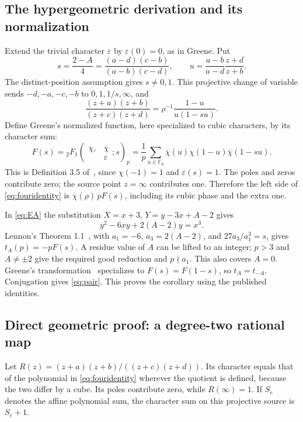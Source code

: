\documentclass[11pt]{article}
\theoremstyle{definition}\newtheorem{definition}[theorem]{Definition}
\newcommand{\Fp}{\mathbb F_p}
\begin{document}
\subsection{The hypergeometric derivation and its normalization}
Extend the trivial character $\varepsilon$ by $\varepsilon(0)=0$,
as in Greene. Put
\[
 s=\frac{2-A}{4}
   =\frac{(a-d)(c-b)}{(a-b)(c-d)},\qquad
 u=\frac{a-b}{a-d}\frac{z+d}{z+b}.
\]
The distinct-position assumption gives $s\ne0,1$. This projective
change of variable sends $-d,-a,-c,-b$ to $0,1,1/s,\infty$, and
\[
 \frac{(z+a)(z+b)}{(z+c)(z+d)}
   =\rho^{-1}\frac{1-u}{u(1-su)}.
\]
Define Greene's normalized function, here specialized to cubic
characters, by its character sum:
\begin{equation}\label{eq:greene}
 F(s)={}_2F_1\!\left(\begin{matrix}\chi,&\overline\chi\\&\varepsilon\end{matrix};s\right)_p
 =\frac1p\sum_{u\in\Fp}
      \overline\chi(u)\chi(1-u)\overline\chi(1-su).
\end{equation}
This is Definition 3.5 of~\cite[p.~82]{greene}, since
$\chi(-1)=1$ and $\varepsilon(s)=1$. The poles and zeros contribute
zero; the source point $z=\infty$ contributes one. Therefore the
left side of \eqref{eq:fouridentity} is
$\overline\chi(\rho)\,pF(s)$, including its cubic phase and the
extra one.

In \eqref{eq:EA} the substitution
$X=x+3$, $Y=y-3x+A-2$ gives
\[
 y^2-6xy+2(A-2)y=x^3.
\]
Lennon's Theorem 1.1~\cite{lennon}, with
$a_1=-6$, $a_3=2(A-2)$, and $27a_3/a_1^3=s$, gives
$t_A(p)=-pF(s)$. A residue value of $A$ can be lifted to an integer;
$p>3$ and $A\ne\pm2$ give the required good reduction and
$p\nmid a_1$. This also covers $A=0$.
Greene's transformation~\cite[Theorem 4.4(i), p.~88]{greene}
specializes to $F(s)=F(1-s)$, so $t_A=t_{-A}$.
Conjugation gives \eqref{eq:pair}. This proves the corollary using
the published identities.

\subsection{Direct geometric proof: a degree-two rational map}
Let
$R(z)=(z+a)(z+b)/((z+c)(z+d))$.
Its character equals that of the polynomial in
\eqref{eq:fouridentity} wherever the quotient is defined, because
the two differ by a cube. Its poles contribute zero, while
$R(\infty)=1$. If $S_e$ denotes the affine polynomial sum,
the character sum on this projective source is $S_e+1$.
\end{document}
